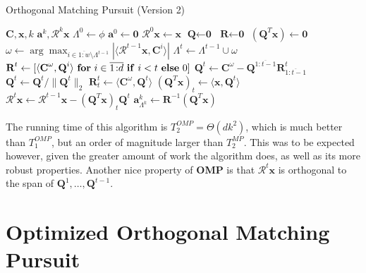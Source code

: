 \documentclass[12pt,a4paper,oneside,english]{UPBThesis}
\newcommand{\hcrange}[2]{\overline{{#1}\colon\!\!{#2}}}
\begin{document}
\begin{algorithm}
\caption{Orthogonal Matching Pursuit (Version 2)}
\label{algo:OrthogonalMatchingPursuitMethodV2}
\begin{algorithmic}
\Require $\textbf{C},\textbf{x},k$
\Ensure $\textbf{a}^k,\mathcal{R}^k\textbf{x}$
\State $\Lambda^0 \gets \phi$
\State $\textbf{a}^0 \gets \textbf{0}$
\State $\mathcal{R}^0\textbf{x} \gets \textbf{x}$
\State $\textbf{Q} \gets \textbf{0}$
\State $\textbf{R} \gets \textbf{0}$
\State $(\textbf{Q}^T\textbf{x}) \gets \textbf{0}$
\For {$t = \hcrange{1}{k}$}
\State $\omega \gets \arg \max_{i \in \hcrange{1}{w} \setminus \Lambda^{t-1}} \left| \langle \mathcal{R}^{t-1}\textbf{x} , \textbf{C}^i \rangle \right|$
\State $\Lambda^t \gets \Lambda^{t-1} \cup \omega$
\State $\textbf{R}^t \gets [ \langle \textbf{C}^\omega, \textbf{Q}^i \rangle~\mbox{\textbf{for} $i \in \hcrange{1}{d}$ \textbf{if} $i < t$ \textbf{else} $0$} ]$ 
\State $\textbf{Q}^t \gets \textbf{C}^\omega - \textbf{Q}^{\hcrange{1}{t-1}}\textbf{R}^t_{\hcrange{1}{t-1}}$ 
\State $\textbf{Q}^t \gets \textbf{Q}^t / \| \textbf{Q}^t \|_2$ 
\State $\textbf{R}^t_t \gets \langle \textbf{C}^\omega, \textbf{Q}^t \rangle$
\State $(\textbf{Q}^T\textbf{x})_t \gets \langle \textbf{x}, \textbf{Q}^t \rangle$
\State $\mathcal{R}^t\textbf{x} \gets \mathcal{R}^{t-1}\textbf{x} -  (\textbf{Q}^T\textbf{x})_t \textbf{Q}^t$
\EndFor
\State $\textbf{a}_{\Lambda^k}^k \gets \textbf{R}^{-1}(\textbf{Q}^T\textbf{x})$
\end{algorithmic}
\end{algorithm}

The running time of this algorithm is $T_2^{OMP} = \Theta(dk^2)$, which is much better than $T_1^{OMP}$, but an order of magnitude larger than $T_2^{MP}$. This was to be expected however, given the greater amount of work the algorithm does, as well as its more robust properties. Another nice property of \textbf{OMP} is that $\mathcal{R}^t\textbf{x}$ is orthogonal to the span of $\textbf{Q}^1,\dots,\textbf{Q}^{t-1}$.

\section{Optimized Orthogonal Matching Pursuit}
\label{ref:OptimizedOrthogonalMatchingPursuit}
\end{document}
